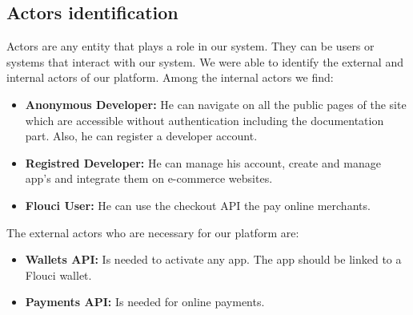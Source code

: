 \begin{spacing}{1.2}
\subsection{Actors identification}
Actors are any entity that plays a role in our system. They can be users or systems that interact with our system. We were able to identify the external and internal actors of our platform. 
\newline
Among the internal actors we find:
\begin{itemize}
  \item \textbf{Anonymous Developer:} He can navigate on all the public pages of the site which are
accessible without authentication including the documentation part. Also, he can register a developer account.
  \item \textbf{Registred Developer:} He can manage his account, create and manage app's and integrate them on e-commerce websites.
  \item \textbf{Flouci User:}  He can use the checkout API the pay online merchants.
\end{itemize}
The external actors who are necessary for our platform are:
\begin{itemize}
  \item \textbf{Wallets API:} Is needed to activate any app. The app should be linked to a Flouci wallet.
  \item \textbf{Payments API:} Is needed for online payments.
\end{itemize}

\end{spacing}
